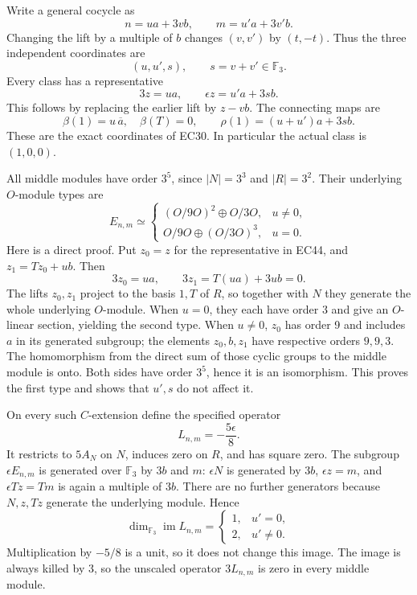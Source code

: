 \documentclass[
  10pt,
]{article}
\begin{document}
Write a general cocycle as \[
n=u a+3v b,\qquad m=u'a+3v'b.
\] Changing the lift by a multiple of \(b\) changes \((v,v')\) by
\((t,-t)\). Thus the three independent coordinates are \[
(u,u',s),\qquad s=v+v'\in\mathbb F_3.
\tag{EC43}
\] Every class has a representative \[
3z=u a,\qquad
\epsilon z=u'a+3s b.
\tag{EC44}
\] This follows by replacing the earlier lift by \(z-vb\). The
connecting maps are \[
\beta(1)=u\,\overline a,\quad\beta(T)=0,\qquad
\rho(1)=(u+u')a+3s b.
\tag{EC45}
\] These are the exact coordinates of EC30. In particular the actual
class is \((1,0,0)\).

All middle modules have order \(3^5\), since \(|N|=3^3\) and
\(|R|=3^2\). Their underlying \(O\)-module types are \[
E_{n,m}\simeq
\begin{cases}
(O/9O)^2\oplus O/3O,&u\ne0,\\
O/9O\oplus(O/3O)^3,&u=0.
\end{cases}
\tag{EC46}
\] Here is a direct proof. Put \(z_0=z\) for the representative in EC44,
and \(z_1=Tz_0+u b\). Then \[
3z_0=u a,\qquad 3z_1=T(u a)+3u b=0.
\] The lifts \(z_0,z_1\) project to the basis \(1,T\) of \(R\), so
together with \(N\) they generate the whole underlying \(O\)-module.
When \(u=0\), they each have order 3 and give an \(O\)-linear section,
yielding the second type. When \(u\ne0\), \(z_0\) has order 9 and
includes \(a\) in its generated subgroup; the elements \(z_0,b,z_1\)
have respective orders \(9,9,3\). The homomorphism from the direct sum
of those cyclic groups to the middle module is onto. Both sides have
order \(3^5\), hence it is an isomorphism. This proves the first type
and shows that \(u',s\) do not affect it.

On every such \(C\)-extension define the specified operator \[
L_{n,m}=-\frac{5\epsilon}{8}.
\tag{EC47}
\] It restricts to \(5A_N\) on \(N\), induces zero on \(R\), and has
square zero. The subgroup \(\epsilon E_{n,m}\) is generated over
\(\mathbb F_3\) by \(3b\) and \(m\): \(\epsilon N\) is generated by
\(3b\), \(\epsilon z=m\), and \(\epsilon Tz=Tm\) is again a multiple of
\(3b\). There are no further generators because \(N,z,Tz\) generate the
underlying module. Hence \[
\dim_{\mathbb F_3}\operatorname{im}L_{n,m}
=\begin{cases}
1,&u'=0,\\
2,&u'\ne0.
\end{cases}
\tag{EC48}
\] Multiplication by \(-5/8\) is a unit, so it does not change this
image. The image is always killed by 3, so the unscaled operator
\(3L_{n,m}\) is zero in every middle module.
\end{document}
